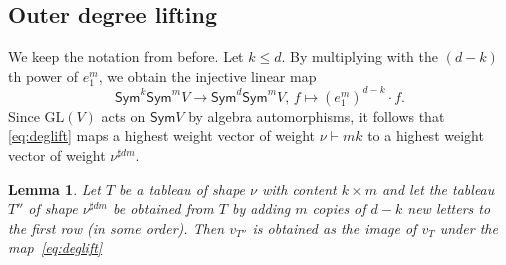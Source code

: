 \documentclass[11pt]{amsart}
\def\C{\mathbb{C}}
\def\GL{\mathrm{GL}}
\def\Sym{\mathsf{Sym}}
\numberwithin{equation}{section}
\newtheorem{lemma}[theorem]{Lemma}
\begin{document}
\subsection{Outer degree lifting} 
\label{se:deglift}

We keep the notation from before.
Let $k\le d$. By multiplying with the $(d-k)$th power of $e_1^m$, 
we obtain the injective linear map
\begin{equation}\label{eq:deglift}
\Sym^k \Sym^m V \to \Sym^d \Sym^m V,\, 
 f\mapsto (e_1^m)^{d-k} \cdot f .
\end{equation}
Since $\GL(V)$ acts on $\Sym V$ by algebra automorphisms, 
it follows that \eqref{eq:deglift} maps a highest weight vector 
of weight $\nu\vdash mk$ to a highest weight vector of weight 
$\nu^{\sharp dm}$. 


\begin{lemma}\label{le:deglift}
Let $T$ be a tableau of shape $\nu$ with content $k\times m$  
and let the tableau $T''$ of shape $\nu^{\sharp dm}$ be obtained from $T$ 
by adding $m$ copies of $d-k$ new letters to the first row (in some order). 
Then $v_{T''}$ is obtained as the image of $v_T$ under the map~\eqref{eq:deglift}
\end{lemma}
\end{document}
